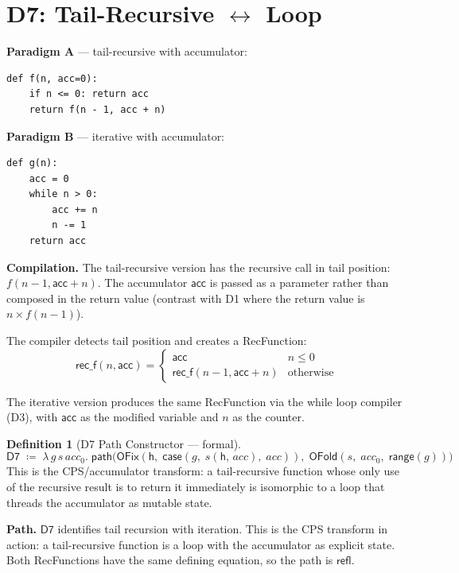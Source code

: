 \documentclass[11pt,a4paper]{report}
\theoremstyle{definition}
\newtheorem{definition}{Definition}[chapter]
\theoremstyle{plain}
\begin{document}
\section{D7: Tail-Recursive $\leftrightarrow$ Loop}
\label{sec:d7}

\textbf{Paradigm A} --- tail-recursive with accumulator:
\begin{lstlisting}
def f(n, acc=0):
    if n <= 0: return acc
    return f(n - 1, acc + n)
\end{lstlisting}

\textbf{Paradigm B} --- iterative with accumulator:
\begin{lstlisting}
def g(n):
    acc = 0
    while n > 0:
        acc += n
        n -= 1
    return acc
\end{lstlisting}

\textbf{Compilation.}
The tail-recursive version has the recursive call in tail position:
$f(n-1, \mathsf{acc} + n)$.  The accumulator $\mathsf{acc}$ is
passed as a parameter rather than composed in the return value
(contrast with D1 where the return value is $n \times f(n-1)$).

The compiler detects tail position and creates a RecFunction:
\[
  \mathsf{rec\_f}(n, \mathsf{acc}) = \begin{cases}
    \mathsf{acc} & n \leq 0 \\
    \mathsf{rec\_f}(n-1, \mathsf{acc} + n) & \text{otherwise}
  \end{cases}
\]

The iterative version produces the same RecFunction via the while
loop compiler (D3), with $\mathsf{acc}$ as the modified variable and
$n$ as the counter.

\begin{definition}[D7 Path Constructor --- formal]
\label{def:d7-path}
\[
  \mathsf{D7} \;\coloneqq\; \lambda\, g\, s\, \mathit{acc}_0.\;
  \mathsf{path}\!\big(
    \mathsf{OFix}(\mathsf{h},\;
      \mathsf{case}(g,\; s(\mathsf{h},\, \mathit{acc}),\;
        \mathit{acc})),\;
    \mathsf{OFold}(s,\; \mathit{acc}_0,\; \mathsf{range}(g))
  \big)
\]
This is the CPS/accumulator transform: a tail-recursive function
whose only use of the recursive result is to return it immediately
is isomorphic to a loop that threads the accumulator as mutable
state.
\end{definition}

\textbf{Path.}
$\mathsf{D7}$ identifies tail recursion with iteration.  This is the
CPS transform in action: a tail-recursive function is a loop with
the accumulator as explicit state.  Both RecFunctions have the same
defining equation, so the path is $\mathsf{refl}$.
\end{document}

